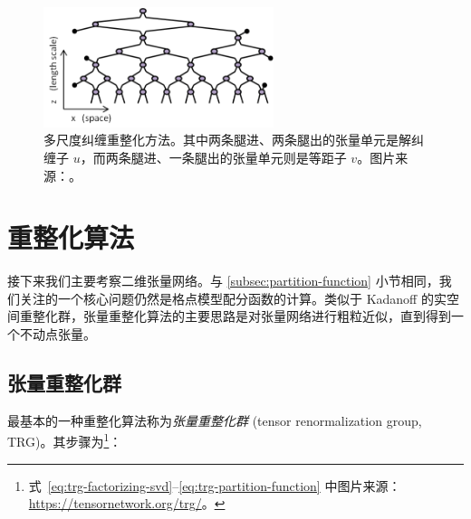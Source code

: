 \begin{figure}[htb]
  \centering
  \includegraphics[width=0.6\textwidth]{images/tensor-network/mera.pdf}
  \caption[多尺度纠缠重整化方法]{多尺度纠缠重整化方法。其中两条腿进、两条腿出的张量单元是解纠缠子 $u$，而两条腿进、一条腿出的张量单元则是等距子 $v$。图片来源：\parencite{evenbly2011tensor}。}
  \label{fig:mera}
\end{figure}

\section{重整化算法}
\label{sec:tensor-network-rg}

接下来我们主要考察二维张量网络。与 \ref{subsec:partition-function} 小节相同，我们关注的一个核心问题仍然是格点模型配分函数的计算。类似于 Kadanoff 的实空间重整化群\cite{pathria2011statistical}，张量重整化算法的主要思路是对张量网络进行粗粒近似，直到得到一个不动点张量。

\subsection{张量重整化群}

最基本的一种重整化算法称为\emph{张量重整化群} (tensor renormalization group, TRG)\cite{levin2007tensor}。其步骤为\footnote{式~\eqref{eq:trg-factorizing-svd}--\eqref{eq:trg-partition-function} 中图片来源：\url{https://tensornetwork.org/trg/}。}：

